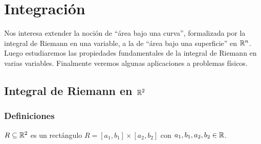 


\chapter{Integraci\'on}\label{cap3}


Nos interesa extender la noci\'on de ``\'area bajo una curva'', formalizada por la integral de Riemann en una variable, a la de ``\'area bajo una superficie'' en $\mathbb{R}^n $. Luego estudiaremos las propiedades fundamentales de la integral de Riemann en varias variables. Finalmente veremos algunas aplicaciones a problemas f\'isicos.



\section{Integral de Riemann en \texorpdfstring{$\mathbb{R}^2$}{R2}}\label{sec:RiemannR2}

\subsection{Definiciones}
\begin{definicion}
$R \subseteq \mathbb{R}^2 $ es un rect\'angulo \tssi{} $ R = [a_1, b_1] \times [a_2, b_2] $ con $ a_1,b_1,a_2,b_2 \in \mathbb{R} $.
\end{definicion}

